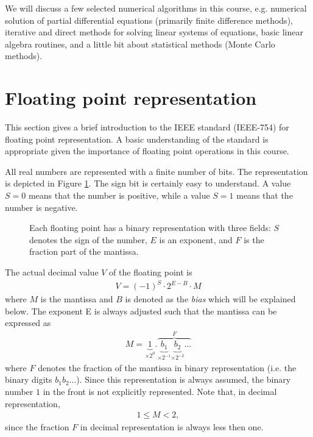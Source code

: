 We will discuss a few selected numerical algorithms in this course, e.g.
numerical solution of partial differential equations (primarily finite
difference methods), iterative and direct methods for solving linear systems of
equations, basic linear algebra routines, and a little bit about statistical
methods (Monte Carlo methods).

\section{Floating point representation}

This section gives a brief introduction to the IEEE standard (IEEE-754) for
floating point representation. A basic understanding of the standard is
appropriate given the importance of floating point operations in this course.

All real numbers are represented with a finite number of bits. The
representation is depicted in Figure \ref{fig:fp}. The sign bit is certainly
easy to understand. A value $S=0$ means that the number is positive, while a
value $S=1$ means that the number is negative.

\begin{figure}
  \centering
  \caption{
    Each floating point has a binary representation with three fields: $S$
    denotes the sign of the number, $E$ is an exponent, and $F$ is the fraction
    part of the mantissa.
  }
  \label{fig:fp}
\end{figure}

The actual decimal value $V$ of the floating point is
\begin{align}
  V = (-1)^S \cdot 2^{E-B}\cdot M
\end{align}
where $M$ is the mantissa and $B$ is denoted as the \emph{bias} which will be
explained below. The exponent E is always adjusted such that the mantissa can be
expressed as
\begin{align}
  M = \underbrace{1}_{\times2^0} .
  \overbrace{\underbrace{b_1}_{\times2^{-1}}
  \underbrace{b_2}_{\times2^{-2}}\ldots}^{F}
\end{align}
where $F$ denotes the fraction of the mantissa in binary representation (i.e.
the binary digits $b_1b_2\ldots$). Since this representation is always assumed,
the binary number $1$ in the front is not explicitly represented. Note that, in
decimal representation,
\begin{align}
  1 \leq M < 2,
\end{align}
since the fraction $F$ in decimal representation is always less then one.

